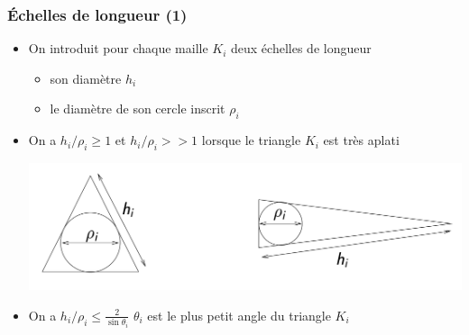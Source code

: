 \documentclass{beamer}
\begin{document}
\begin{frame}
\frametitle{Échelles de longueur (1)}
\begin{itemize}
\item On introduit pour chaque maille $K_i$ deux échelles de longueur
\begin{itemize}
\item son diamètre $h_i$
\item le diamètre de son cercle inscrit $\rho_i$
\end{itemize}

\item On a $h_i/\rho_i \geq 1$  et $h_i/\rho_i >> 1$ lorsque le triangle $K_i$ est très  aplati
\begin{center}
\includegraphics[scale=0.25]{maillage02.png} 
\end{center}
\item On a $h_i/\rho_i \leq \frac{2}{\sin\theta_i}$ $\theta_i$ est le plus petit angle du triangle $K_i$
\end{itemize}
\end{frame}
\end{document}
